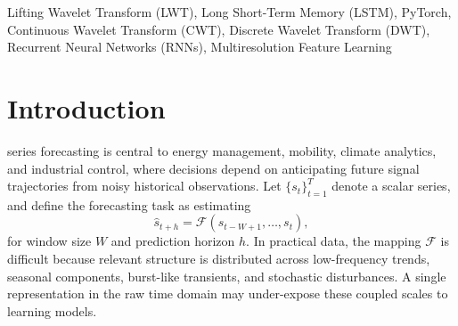 \documentclass[journal]{IEEEtran}
\begin{document}
\begin{IEEEkeywords}
Lifting Wavelet Transform (LWT), Long Short-Term Memory (LSTM), PyTorch, Continuous Wavelet Transform (CWT), Discrete Wavelet Transform (DWT), Recurrent Neural Networks (RNNs), Multiresolution Feature Learning
\end{IEEEkeywords}






%
\IEEEpeerreviewmaketitle



\section{Introduction}
% 
% 
% 
% 
 series forecasting is central to energy management, mobility, climate analytics, and industrial control, where decisions depend on anticipating future signal trajectories from noisy historical observations. Let $\{s_t\}_{t=1}^{T}$ denote a scalar series, and define the forecasting task as estimating
\begin{equation}
\hat{s}_{t+h}=\mathcal{F}(s_{t-W+1},\ldots,s_t),
\end{equation}
for window size $W$ and prediction horizon $h$. In practical data, the mapping $\mathcal{F}$ is difficult because relevant structure is distributed across low-frequency trends, seasonal components, burst-like transients, and stochastic disturbances. A single representation in the raw time domain may under-expose these coupled scales to learning models.
\end{document}
